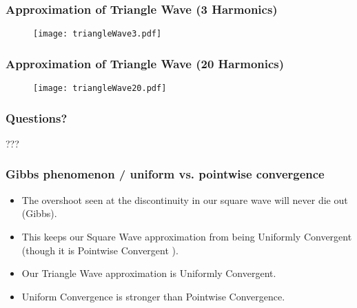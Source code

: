 \documentclass{beamer}
\begin{document}
\begin{frame}[fragile]
   \frametitle{Approximation of Triangle Wave (3 Harmonics)}
   \begin{figure}
   \texttt{[image: triangleWave3.pdf]}
   \end{figure}
\end{frame}

\begin{frame}[fragile]
   \frametitle{Approximation of Triangle Wave (20 Harmonics)}
   \begin{figure}
   \texttt{[image: triangleWave20.pdf]}
   \end{figure}
\end{frame}

\begin{frame}[fragile]
   \frametitle{Questions?}
   \begin{center}
      {\fontsize{50}{60}\selectfont ???}
   \end{center}
\end{frame}

\begin{frame}
   \frametitle{Gibbs phenomenon / uniform vs. pointwise convergence}
   \begin{block}{}
      \begin{itemize}
         \item The overshoot seen at the discontinuity in our square wave will never die out (Gibbs). 
         \item This keeps our Square Wave approximation from being Uniformly Convergent (though it is Pointwise Convergent \footnotemark).
         \item Our Triangle Wave approximation is Uniformly Convergent.
         \item Uniform Convergence is stronger than Pointwise Convergence.
      \end{itemize}
   \end{block}
\end{frame}
\end{document}
